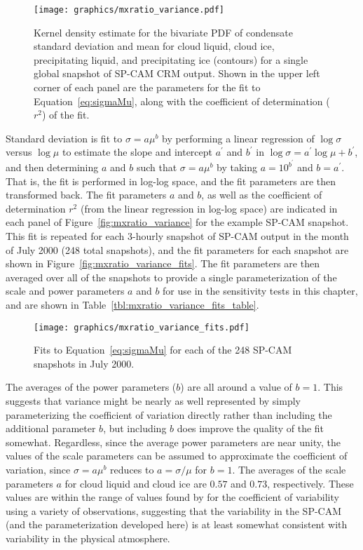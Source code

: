 \begin{figure}[tp]
\centering
\texttt{[image: graphics/mxratio\_variance.pdf]}
\caption{\label{fig:mxratio_variance}Kernel density estimate for the
bivariate PDF of condensate standard deviation and mean for cloud
liquid, cloud ice, precipitating liquid, and precipitating ice
(contours) for a single global snapshot of SP-CAM CRM output. Shown in
the upper left corner of each panel are the parameters for the fit to
Equation~\ref{eq:sigmaMu}, along with the coefficient of determination
(\(r^2\)) of the fit.}\label{fig:mxratioux5fvariance}
\end{figure}

Standard deviation is fit to \(\sigma = a \mu^b\) by performing a linear
regression of \(\log\sigma\) versus \(\log \mu\) to estimate the slope
and intercept \(a^{\prime}\) and \(b^{\prime}\) in
\(\log \sigma = a^{\prime} \log \mu + b^{\prime}\), and then determining
\(a\) and \(b\) such that \(\sigma = a \mu^b\) by taking
\(a = 10^{b^{\prime}}\) and \(b = a^{\prime}\). That is, the fit is
performed in log-log space, and the fit parameters are then transformed
back. The fit parameters \(a\) and \(b\), as well as the coefficient of
determination \(r^2\) (from the linear regression in log-log space) are
indicated in each panel of Figure~\ref{fig:mxratio_variance} for the
example SP-CAM snapshot. This fit is repeated for each 3-hourly snapshot
of SP-CAM output in the month of July 2000 (248 total snapshots), and
the fit parameters for each snapshot are shown in
Figure~\ref{fig:mxratio_variance_fits}. The fit parameters are then
averaged over all of the snapshots to provide a single parameterization
of the scale and power parameters \(a\) and \(b\) for use in the
sensitivity tests in this chapter, and are shown in
Table~\ref{tbl:mxratio_variance_fits_table}.

\begin{figure}[tp]
\centering
\texttt{[image: graphics/mxratio\_variance\_fits.pdf]}
\caption{\label{fig:mxratio_variance_fits}Fits to
Equation~\ref{eq:sigmaMu} for each of the 248 SP-CAM snapshots in July
2000.}\label{fig:mxratioux5fvarianceux5ffits}
\end{figure}

The averages of the power parameters (\(b\)) are all around a value of
\(b = 1\). This suggests that variance might be nearly as well
represented by simply parameterizing the coefficient of variation
directly rather than including the additional parameter \(b\), but
including \(b\) does improve the quality of the fit somewhat.
Regardless, since the average power parameters are near unity, the
values of the scale parameters can be assumed to approximate the
coefficient of variation, since \(\sigma = a \mu^b\) reduces to
\(a = \sigma / \mu\) for \(b = 1\). The averages of the scale parameters
\(a\) for cloud liquid and cloud ice are \(0.57\) and \(0.73\),
respectively. These values are within the range of values found by
\citet{shonk_et_al_2010} for the coefficient of variability using a
variety of observations, suggesting that the variability in the SP-CAM
(and the parameterization developed here) is at least somewhat
consistent with variability in the physical atmosphere.

